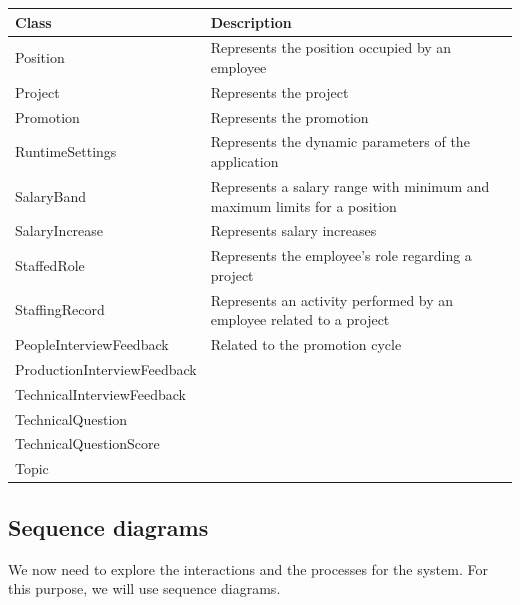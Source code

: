 \documentclass[12pt,a4paper,table,english]{article}
\begin{document}
	\begin{center}
		\renewcommand{\arraystretch}{1.5} %
		\begin{tabularx}{\textwidth}{| l | X |}
			\hline
			\textbf{Class} & \textbf{Description} \\\hline
			
						
			Position & Represents the position occupied by an employee \\\hline
			
			Project & Represents the project \\\hline
			
			Promotion & Represents the promotion \\\hline
			
			RuntimeSettings & Represents the dynamic parameters of the application\\\hline
			
			SalaryBand & Represents a salary range with minimum and maximum limits for a position \\\hline
			
			SalaryIncrease & Represents salary increases \\\hline
			
			StaffedRole & Represents the employee's role regarding a project \\\hline
			
			StaffingRecord & Represents an activity performed by an employee related to a project \\\hline\hline
			
			PeopleInterviewFeedback & Related to the promotion cycle\\
			ProductionInterviewFeedback & \\
			TechnicalInterviewFeedback & \\
			TechnicalQuestion & \\
			TechnicalQuestionScore & \\
			Topic & \\\hline
			 
		
		\end{tabularx}
	\end{center}

\newpage	
	
	\subsection{Sequence diagrams}
	
	We now need to explore the interactions and the processes for the system. For this purpose, we will use sequence diagrams.
	
\end{document}

